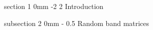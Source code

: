 \documentclass{article}
\makeatletter
\newcommand{\1}{\mathds{1}}
\numberwithin{equation}{section}
\newcommand{\Z}{\mathbb{Z}}
\theoremstyle{plain} %
\theoremstyle{remark}
\newcommand{\cor}{\color{red}}
\renewcommand{\section}{\@startsection
{section}%
{1}%
{0mm}%
{-2\baselineskip}%
{2\baselineskip}%
{\normalfont\large\scshape\centering}} %
\renewcommand{\subsection}{\@startsection
{subsection}%
{2}%
{0mm}%
{-\baselineskip}%
{0.5\baselineskip}%
{\normalfont\bf\itshape}} %
\newcommand{\hty}[1]{{\cor (ht: #1) }}
\makeatother
\begin{document}
\tableofcontents


\newpage

\section{Introduction}


\subsection{Random band matrices} 

%
\end{document}
